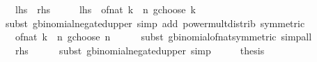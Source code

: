\begin{isabellebody}
\ \ {\isacharparenleft}{\kern0pt}\ {\isachardoublequoteopen}{\isacharquery}{\kern0pt}lhs\ {\isacharequal}{\kern0pt}\ {\isacharquery}{\kern0pt}rhs{\isachardoublequoteclose}{\isacharparenright}{\kern0pt}\isanewline
%
\isadelimproof
%
\endisadelimproof
%
\isatagproof
{}\isamarkupfalse%
\ {\isacharminus}{\kern0pt}\isanewline
\ \ \isamarkupfalse%
\ {\isachardoublequoteopen}{\isacharquery}{\kern0pt}lhs\ {\isacharequal}{\kern0pt}\ {\isacharparenleft}{\kern0pt}of{\isacharunderscore}{\kern0pt}nat\ {\isacharparenleft}{\kern0pt}k\ {\isacharplus}{\kern0pt}\ n{\isacharparenright}{\kern0pt}\ gchoose\ k{\isacharparenright}{\kern0pt}{\isachardoublequoteclose}\isanewline
\ \ \ \ \isamarkupfalse%
\ {\isacharparenleft}{\kern0pt}subst\ gbinomial{\isacharunderscore}{\kern0pt}negated{\isacharunderscore}{\kern0pt}upper{\isacharparenright}{\kern0pt}\ {\isacharparenleft}{\kern0pt}simp\ add{\isacharcolon}{\kern0pt}\ power{\isacharunderscore}{\kern0pt}mult{\isacharunderscore}{\kern0pt}distrib\ {\isacharbrackleft}{\kern0pt}symmetric{\isacharbrackright}{\kern0pt}{\isacharparenright}{\kern0pt}\isanewline
\ \ \isamarkupfalse%
\ \isamarkupfalse%
\ {\isachardoublequoteopen}{\isasymdots}\ {\isacharequal}{\kern0pt}\ {\isacharparenleft}{\kern0pt}of{\isacharunderscore}{\kern0pt}nat\ {\isacharparenleft}{\kern0pt}k\ {\isacharplus}{\kern0pt}\ n{\isacharparenright}{\kern0pt}\ gchoose\ n{\isacharparenright}{\kern0pt}{\isachardoublequoteclose}\isanewline
\ \ \ \ \isamarkupfalse%
\ {\isacharparenleft}{\kern0pt}subst\ gbinomial{\isacharunderscore}{\kern0pt}of{\isacharunderscore}{\kern0pt}nat{\isacharunderscore}{\kern0pt}symmetric{\isacharparenright}{\kern0pt}\ simp{\isacharunderscore}{\kern0pt}all\isanewline
\ \ \isamarkupfalse%
\ \isamarkupfalse%
\ {\isachardoublequoteopen}{\isasymdots}\ {\isacharequal}{\kern0pt}\ {\isacharquery}{\kern0pt}rhs{\isachardoublequoteclose}\isanewline
\ \ \ \ \isamarkupfalse%
\ {\isacharparenleft}{\kern0pt}subst\ gbinomial{\isacharunderscore}{\kern0pt}negated{\isacharunderscore}{\kern0pt}upper{\isacharparenright}{\kern0pt}\ simp\isanewline
\ \ \isamarkupfalse%
\ \isamarkupfalse%
\ {\isacharquery}{\kern0pt}thesis\ \isacommand{{\isachardot}{\kern0pt}}\isamarkupfalse%
\isanewline
{}\isamarkupfalse%
%
\endisatagproof
{\isafoldproof}%
%
\isadelimproof
\isanewline
%
\endisadelimproof
\isanewline
{}\isamarkupfalse%

\end{isabellebody}
